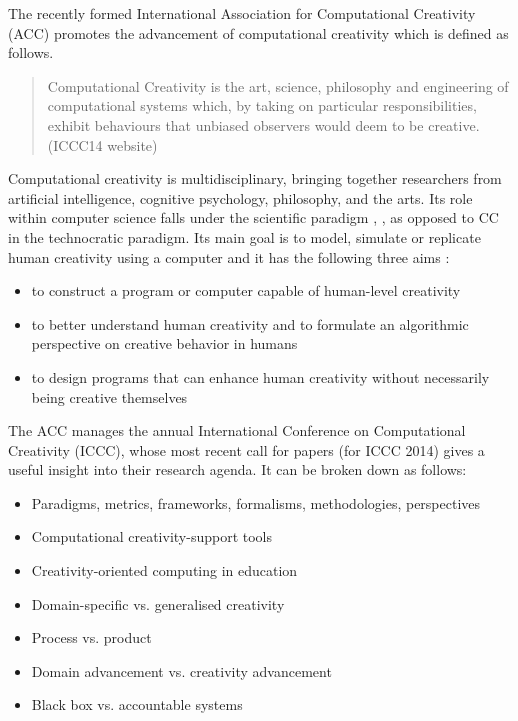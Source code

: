 The recently formed International Association for Computational Creativity (ACC)  promotes the advancement of computational creativity which is defined as follows.

\begin{quote}
  Computational Creativity is the art, science, philosophy and engineering of computational systems which, by taking on particular responsibilities, exhibit behaviours that unbiased observers would deem to be creative. (ICCC14 website)
\end{quote}

Computational creativity is multidisciplinary, bringing together researchers from artificial intelligence, cognitive psychology, philosophy, and the arts. Its role within computer science falls under the scientific paradigm \citep[p.8]{Hugill2013}, \citep[see also]{Eden2007}, as opposed to CC in the technocratic paradigm. Its main goal is to model, simulate or replicate human creativity using a computer and it has the following three aims :

\begin{itemize}
  \item to construct a program or computer capable of human-level creativity
  \item to better understand human creativity and to formulate an algorithmic perspective on creative behavior in humans
  \item to design programs that can enhance human creativity without necessarily being creative themselves
\end{itemize}

The ACC manages the annual International Conference on Computational Creativity (ICCC), whose most recent call for papers  (for ICCC 2014) gives a useful insight into their research agenda. It can be broken down as follows:

\begin{itemize}
  \item Paradigms, metrics, frameworks, formalisms, methodologies, perspectives
  \item Computational creativity-support tools
  \item Creativity-oriented computing in education
  \item Domain-specific vs. generalised creativity
  \item Process vs. product
  \item Domain advancement vs. creativity advancement
  \item Black box vs. accountable systems
\end{itemize}

